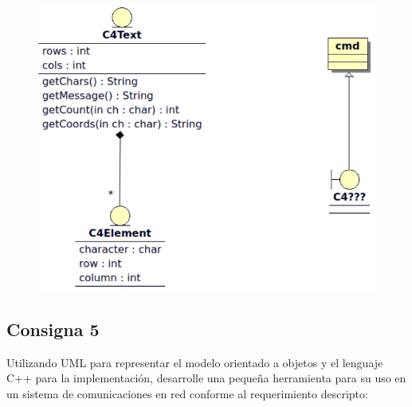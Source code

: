 \documentclass[a4paper,12pt]{article}
\begin{document}
\begin{figure}[!h]
        \centering
        \includegraphics[scale=0.5]{C4/Diagrama_de_Clases_C4.PNG}
\end{figure}

\subsection{Consigna 5}

Utilizando UML para representar el modelo orientado a objetos y el lenguaje C++ para la implementación, desarrolle una pequeña herramienta para su uso en un sistema de comunicaciones en red conforme al requerimiento descripto:
\end{document}
